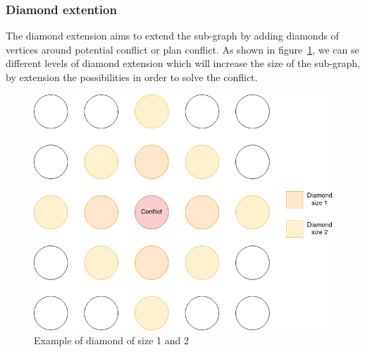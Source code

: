 \subsubsection{Diamond extention}

The diamond extension aims to extend the sub-graph by adding diamonds of vertices around potential conflict or plan conflict. As shown in figure~\ref{img:diamond}, we can se different levels of diamond extension which will increase the size of the sub-graph, by extension the possibilities in order to solve the conflict.
\begin{figure}[H]
  \centering
  \caption{Example of diamond of size 1 and 2}\label{img:diamond}
  \includegraphics[width=\widthimg]{img/diamond.drawio.png}
\end{figure}

